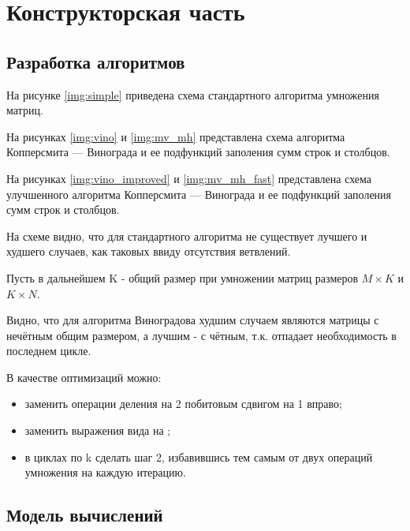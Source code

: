 \chapter{Конструкторская часть}

\section{Разработка алгоритмов}

На рисунке \ref{img:simple} приведена схема стандартного алгоритма умножения матриц.

На рисунках \ref{img:vino} и \ref{img:mv_mh} представлена схема алгоритма Копперсмита — Винограда и ее подфункций заполения сумм строк и столбцов.

На рисунках \ref{img:vino_improved} и \ref{img:mv_mh_fast} представлена схема улучшенного алгоритма Копперсмита — Винограда и ее подфункций заполения сумм строк и столбцов.

\clearpage
{}

На схеме видно, что для стандартного алгоритма не существует лучшего и худшего случаев, как таковых ввиду отсутствия ветвлений.

\clearpage
{}
Пусть в дальнейшем K - общий размер при умножении матриц размеров $M \times K$ и $K \times N$.

Видно, что для алгоритма Виноградова худшим случаем являются матрицы с нечётным общим размером, а лучшим - с чётным, т.к. отпадает необходимость в последнем цикле.

В качестве оптимизаций можно:
\begin{itemize}
	\item заменить операции деления на 2 побитовым сдвигом на 1 вправо;
	\item заменить выражения вида  на ;
	\item в циклах по k сделать шаг 2, избавившись тем самым от двух операций умножения на каждую итерацию.
\end{itemize}

\clearpage
{}


\section{Модель вычислений}

